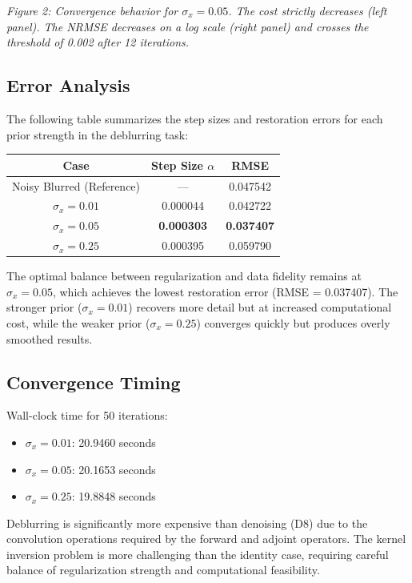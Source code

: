\documentclass[12pt]{article}
\begin{document}
\textit{Figure 2: Convergence behavior for $\sigma_x = 0.05$. The cost strictly decreases (left panel). The NRMSE decreases on a log scale (right panel) and crosses the threshold of 0.002 after 12 iterations.}

\subsection*{Error Analysis}

The following table summarizes the step sizes and restoration errors for each prior strength in the deblurring task:

\begin{center}
\begin{tabular}{|c|c|c|}
\hline
\textbf{Case} & \textbf{Step Size } $\alpha$ & \textbf{RMSE} \\
\hline
Noisy Blurred (Reference) & --- & 0.047542 \\
\hline
$\sigma_x = 0.01$ & 0.000044 & 0.042722 \\
\hline
\textbf{$\sigma_x = 0.05$} & \textbf{0.000303} & \textbf{0.037407} \\
\hline
$\sigma_x = 0.25$ & 0.000395 & 0.059790 \\
\hline
\end{tabular}
\end{center}

The optimal balance between regularization and data fidelity remains at $\sigma_x = 0.05$, which achieves the lowest restoration error (RMSE = 0.037407). The stronger prior ($\sigma_x = 0.01$) recovers more detail but at increased computational cost, while the weaker prior ($\sigma_x = 0.25$) converges quickly but produces overly smoothed results.

\subsection*{Convergence Timing}

Wall-clock time for 50 iterations:
\begin{itemize}
    \item $\sigma_x = 0.01$: 20.9460 seconds
    \item $\sigma_x = 0.05$: 20.1653 seconds
    \item $\sigma_x = 0.25$: 19.8848 seconds
\end{itemize}

Deblurring is significantly more expensive than denoising (D8) due to the convolution operations required by the forward and adjoint operators. The kernel inversion problem is more challenging than the identity case, requiring careful balance of regularization strength and computational feasibility.
\end{document}
